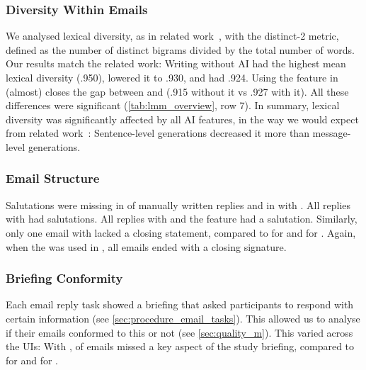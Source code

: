 \subsubsection{Diversity Within Emails}\label{sec:results_lexical_diversity}
We analysed lexical diversity, as in related work~\cite{Fu2023sentencevsmessage}, with the distinct-2 metric, defined as the number of distinct bigrams divided by the total number of words.
Our results match the related work: Writing without AI had the highest mean lexical diversity (.950), \modemail{} lowered it to .930, and \modeours{} had .924.
Using the \imppass{} feature in \modeours{} (almost) closes the gap between \modeours{} and \modemail{} (.915 without it vs .927 with it). 
All these differences were significant (\cref{tab:lmm_overview}, row 7). In summary, lexical diversity was significantly affected by all AI features, in the way we would expect from related work~\cite{Fu2023sentencevsmessage}: Sentence-level generations decreased it more than message-level generations.







\subsubsection{Email Structure}\label{sec:results_structure}

Salutations were missing in  of manually written replies and in  with \modeours. All replies with \modemail{} had salutations. All replies with \modeours{} and the \imppass{} feature had a salutation.
Similarly, only one email with \modemail{} lacked a closing statement, compared to  for \modemanual{} and  for \modeours. Again, when the \imppass{} was used in \modeours, all emails ended with a closing signature.


\subsubsection{Briefing Conformity}\label{sec:results_briefing}
Each email reply task showed a briefing that asked participants to respond with certain information (see \cref{sec:procedure_email_tasks}). This allowed us to analyse if their emails conformed to this or not (see \cref{sec:quality_m}).
This varied across the UIs: With \modeours,  of emails missed a key aspect of the study briefing, compared to  for \modemail{} and  for \modemanual.


